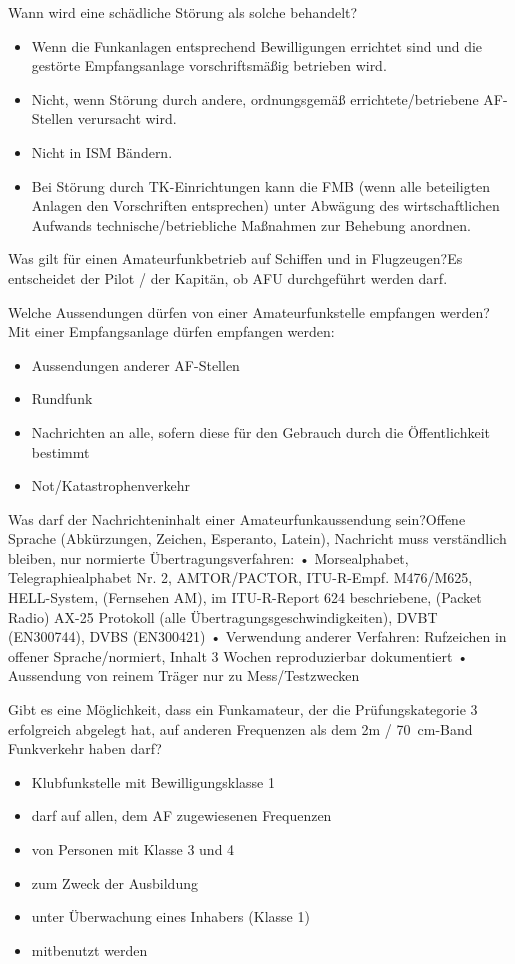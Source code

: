 \documentclass[avery5371,grid,frame,a4paper]{flashcards}
\newcommand{\card}[3]{
  \begin{flashcard}[{\chap} -- #1]{#2}#3\end{flashcard}
}
\begin{document}
\card{47}{Wann wird eine schädliche Störung als solche behandelt?}{
  \small
  \begin{itemize}\itemsep0pt
    \item Wenn die Funkanlagen entsprechend Bewilligungen errichtet sind und die gestörte Empfangsanlage vorschriftsmäßig betrieben wird.
    \item Nicht, wenn Störung durch andere, ordnungsgemäß errichtete/betriebene AF-Stellen verursacht wird.
    \item Nicht in ISM Bändern.
    \item Bei Störung durch TK-Einrichtungen kann die FMB (wenn alle beteiligten Anlagen den Vorschriften entsprechen) unter Abwägung des wirtschaftlichen Aufwands technische/betriebliche Maßnahmen zur Behebung anordnen.
  \end{itemize}
}

\card{48}{Was gilt für einen Amateurfunkbetrieb auf Schiffen und in Flugzeugen?}{Es entscheidet der Pilot / der Kapitän, ob AFU durchgeführt werden darf.}

\card{49}{Welche Aussendungen dürfen von einer Amateurfunkstelle empfangen werden?}{Mit einer Empfangsanlage dürfen empfangen werden: \begin{itemize}\itemsep1pt \item Aussendungen anderer AF-Stellen \item Rundfunk \item Nachrichten an alle, sofern diese für den
Gebrauch durch die Öffentlichkeit bestimmt \item Not/Katastrophenverkehr\end{itemize}}

\card{50}{Was darf der Nachrichteninhalt einer Amateurfunkaussendung sein?}{\small{Offene Sprache (Abkürzungen, Zeichen, Esperanto, Latein), Nachricht muss verständlich bleiben, nur normierte Übertragungsverfahren:
•  Morsealphabet, Telegraphiealphabet Nr. 2, AMTOR/PACTOR, ITU-R-Empf. M476/M625, HELL-System, (Fernsehen AM), im ITU-R-Report 624 beschriebene, (Packet Radio) AX-25
Protokoll (alle Übertragungsgeschwindigkeiten), DVBT (EN300744), DVBS (EN300421)
•  Verwendung anderer Verfahren: Rufzeichen in offener Sprache/normiert, Inhalt 3 Wochen reproduzierbar dokumentiert
•  Aussendung von reinem Träger nur zu Mess/Testzwecken}}

\card{51}{Gibt es eine Möglichkeit, dass ein Funkamateur, der die Prüfungskategorie 3 erfolgreich abgelegt hat, auf anderen Frequenzen als dem 2m / \SI{70}{\centi\metre}-Band Funkverkehr haben darf?}{\begin{itemize}\itemsep1pt \item Klubfunkstelle mit Bewilligungsklasse 1 \item darf auf allen, dem AF zugewiesenen Frequenzen \item von Personen mit Klasse 3 und 4 \item zum Zweck der Ausbildung \item unter Überwachung eines Inhabers (Klasse 1) \item mitbenutzt werden\end{itemize}}
\end{document}

